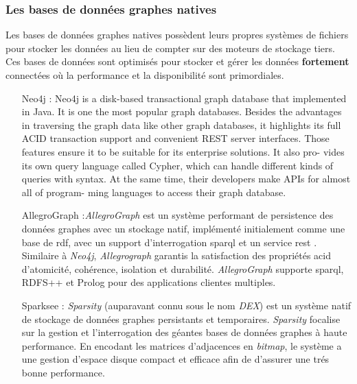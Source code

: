     \subsubsection{Les bases de données graphes natives}
    \label{sec:graphdb-native}
    Les bases de données graphes natives possèdent leurs propres
    systèmes de fichiers pour stocker les données au lieu de compter
    sur des moteurs de stockage tiers. Ces bases de données sont
    optimisés pour stocker et gérer les données \textbf{fortement}
    connectées où la performance et la disponibilité sont
    primordiales.

    \begin{itemize}
    \item [Neo4j]: Neo4j \cite{neo4j} is a disk-based transactional
      graph database that implemented in Java. It is one the most
      popular graph databases. Besides the advantages in traversing
      the graph data like other graph databases, it highlights its
      full ACID transaction support and convenient REST server
      interfaces. Those features ensure it to be suitable for its
      enterprise solutions. It also pro- vides its own query language
      called Cypher, which can handle different kinds of queries with
      syntax. At the same time, their developers make APIs for almost
      all of program- ming languages to access their graph database.

    \item [AllegroGraph]:\emph{AllegroGraph} \cite{allegrograph} est
      un système performant de persistence des données graphes avec un
      stockage natif, implémenté initialement comme une base de
      \acrshort{rdf}, avec un support d'interrogation
      \acrshort{sparql} et un service \acrshort{rest}
      \cite{fielding2000architectural}. Similaire à \emph{Neo4j},
      \emph{Allegrograph} garantis la satisfaction des propriétés
      \acrshort{acid} d'atomicité, cohérence, isolation et
      durabilité. \emph{AllegroGraph} supporte \acrshort{sparql},
      RDFS++ et Prolog pour des applications clientes multiples.

    \item [Sparksee]: \emph{Sparsity} \cite{sparksee} (auparavant
      connu sous le nom \emph{DEX}) est un système natif de stockage
      de données graphes persistants et temporaires. \emph{Sparsity}
      focalise sur la gestion et l'interrogation des géantes bases de
      données graphes à haute performance. En encodant les matrices
      d'adjacences en \emph{bitmap}, le système a une gestion d'espace
      disque compact et efficace afin de d'assurer une trés bonne
      performance.


\end{itemize}
